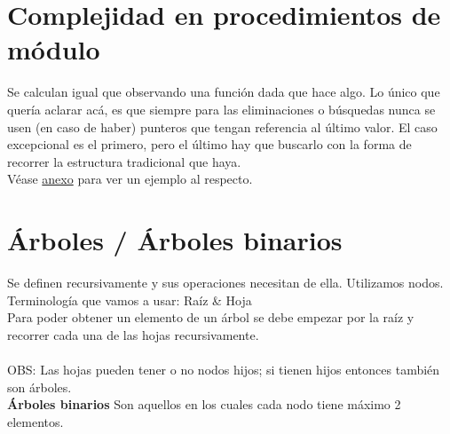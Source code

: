 \documentclass[10pt,a4paper]{article}
\begin{document}
\section*{Complejidad en procedimientos de módulo}
Se calculan igual que observando una función dada que hace algo. Lo único que quería aclarar acá, es que siempre para las eliminaciones o búsquedas nunca se usen (en caso de haber) punteros que tengan referencia al último valor. El caso excepcional es el primero, pero el último hay que buscarlo con la forma de recorrer la estructura tradicional que haya. \\
Véase \hyperref[subsec:complejidad_modulo_sll]{anexo} para ver un ejemplo al respecto.
\section*{Árboles / Árboles binarios}
Se definen recursivamente y sus operaciones necesitan de ella. Utilizamos nodos. \\
Terminología que vamos a usar: Raíz \& Hoja \\ 
Para poder obtener un elemento de un árbol se debe empezar por la raíz y recorrer cada una de las hojas recursivamente. \\ \\
OBS: Las hojas pueden tener o no nodos hijos; si tienen hijos entonces también son árboles.  \\ 
\textbf{Árboles binarios}
Son aquellos en los cuales cada nodo tiene máximo 2 elementos.
\end{document}

